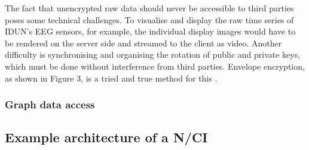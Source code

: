 
The fact that unencrypted raw data should never be accessible to third parties poses some technical challenges. To visualise and display the raw time series of IDUN's EEG sensors, for example, the individual display images would have to be rendered on the server side and streamed to the client as video. Another difficulty is synchronising and organising the rotation of public and private keys, which must be done without interference from third parties. Envelope encryption, as shown in Figure 3, is a tried and true method for this \citep{google_cloud_envelope_nodate}.


\subsubsection{Graph data access}
\label{chapter5-graph-data-access}


\subsection{Example architecture of a N/CI}
\label{chapter5-example-architecture-of-a-nci}





